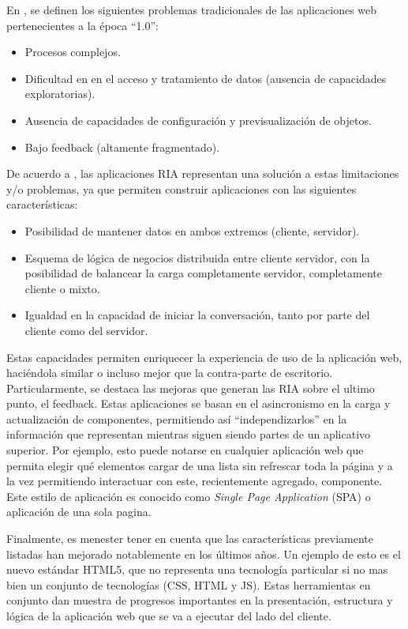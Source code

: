 En \citet{Duhl2003}, se definen los siguientes problemas tradicionales de las aplicaciones web pertenecientes a la época ``1.0'':
\begin{itemize}
\item Procesos complejos.
\item Dificultad en en el acceso y tratamiento de datos (ausencia de capacidades exploratorias).
\item Ausencia de capacidades de configuración y previsualización de objetos.
\item Bajo feedback (altamente fragmentado).
\end{itemize}
De acuerdo a  \citet{Fraternali2010}, las aplicaciones RIA representan una solución a estas limitaciones y/o problemas, ya que permiten construir aplicaciones con las siguientes características:
\begin{itemize}
\item Posibilidad de mantener datos en ambos extremos (cliente, servidor).
\item Esquema de lógica de negocios distribuida entre cliente servidor, con la posibilidad de balancear la carga completamente servidor, completamente cliente o mixto.
\item Igualdad en la capacidad de iniciar la conversación, tanto por parte del cliente como del servidor.
\end{itemize}

Estas capacidades permiten enriquecer la experiencia de uso de la aplicación web, haciéndola similar o incluso mejor que la contra-parte de escritorio. Particularmente, se destaca las mejoras que generan las RIA sobre el ultimo punto, el feedback. Estas aplicaciones se basan en el asincronismo en la carga y actualización de componentes, permitiendo así ``independizarlos'' en la información que representan mientras siguen siendo partes de un aplicativo superior. Por ejemplo, esto puede notarse en cualquier aplicación web que permita elegir qué elementos cargar de una lista sin refrescar toda la página y a la vez permitiendo interactuar con este, recientemente agregado, componente. Este estilo de aplicación es conocido como \emph{Single Page Application} (SPA) o aplicación de una sola pagina.

Finalmente, es menester tener en cuenta que las características previamente listadas han mejorado notablemente en los últimos años. Un ejemplo de esto es el nuevo estándar HTML5, que no representa una tecnología particular si no mas bien un conjunto de tecnologías (CSS, HTML y JS). Estas herramientas en conjunto dan muestra de progresos importantes en la presentación, estructura y lógica de la aplicación web que se va a ejecutar del lado del cliente.

